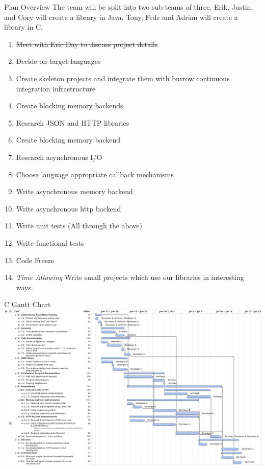 \documentclass{beamer}
\begin{document}
\begin{frame}{Plan Overview}
  The team will be split into two sub-teams of three.
  Erik, Justin, and Cory will create a library in Java.
  Tony, Fede and Adrian will create a library in C.

  \begin{enumerate}
  \item \sout{Meet with Eric Day to discuss project details}
  \item \sout{Decide on target languages}
  \item Create skeleton projects and integrate them with burrow continuous integration infrastructure
  \item Create blocking memory backends
  \item Research JSON and HTTP libraries
  \item Create blocking memory backend 
  \item Research asynchronous I/O
  \item Choose language appropriate callback mechanisms
  \item Write asynchronous memory backend
  \item Write asynchronous http backend
  \item Write unit tests (All through the above)
  \item Write functional tests
  \item Code Freeze
  \item \textit{Time Allowing} Write small projects which use our libraries in interesting ways.
  \end{enumerate}
\end{frame}

\begin{frame}{C Gantt Chart}
  \includegraphics{C-Gantt.pdf}
\end{frame}
\end{document}
